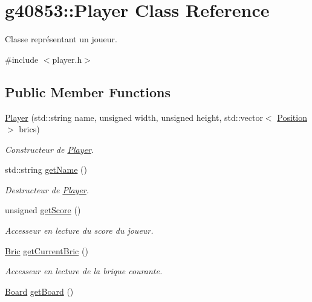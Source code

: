 \hypertarget{classg40853_1_1_player}{}\section{g40853\+:\+:Player Class Reference}
\label{classg40853_1_1_player}


Classe représentant un joueur.  




{\ttfamily \#include $<$player.\+h$>$}

\subsection*{Public Member Functions}
\begin{DoxyCompactItemize}
\item 
\hyperlink{classg40853_1_1_player_a04118d9fdfaa434e17a6bb23ad7061ca}{Player} (std\+::string name, unsigned width, unsigned height, std\+::vector$<$ \hyperlink{classg40853_1_1_position}{Position} $>$ brics)
\begin{DoxyCompactList}\small\item\em Constructeur de \hyperlink{classg40853_1_1_player}{Player}. \end{DoxyCompactList}\item 
std\+::string \hyperlink{classg40853_1_1_player_a9dd73fb755774274ec182527c7401e84}{get\+Name} ()
\begin{DoxyCompactList}\small\item\em Destructeur de \hyperlink{classg40853_1_1_player}{Player}. \end{DoxyCompactList}\item 
unsigned \hyperlink{classg40853_1_1_player_a9f0a1c56d503a6eb8f20553d8cb3bfb0}{get\+Score} ()
\begin{DoxyCompactList}\small\item\em Accesseur en lecture du score du joueur. \end{DoxyCompactList}\item 
\hyperlink{classg40853_1_1_bric}{Bric} \hyperlink{classg40853_1_1_player_abda6e0fda90db2b7bb252907529f8bb5}{get\+Current\+Bric} ()
\begin{DoxyCompactList}\small\item\em Accesseur en lecture de la brique courante. \end{DoxyCompactList}\item 
\hyperlink{classg40853_1_1_board}{Board} \hyperlink{classg40853_1_1_player_a76d25f8b4776c282e9852b7ae9fad017}{get\+Board} ()

\end{DoxyCompactItemize}
